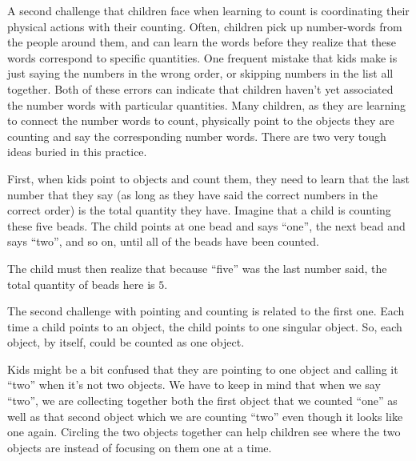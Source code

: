 \documentclass{ximera}
\begin{document}
A second challenge that children face when learning to count is coordinating their physical actions with their counting. Often, children pick up number-words from the people around them, and can learn the words before they realize that these words correspond to specific quantities.  One frequent mistake that kids make is just saying the numbers in the wrong order, or skipping numbers in the list all together. Both of these errors can indicate that children haven't yet associated the number words with particular quantities. Many children, as they are learning to connect the number words to  count, physically point to the objects they are counting and say the corresponding number words. There are two very tough ideas buried in this practice.

First, when kids point to objects and count them, they need to learn that the last number that they say (as long as they have said the correct numbers in the correct order) is the total quantity they have. Imagine that a child is counting these five beads. The child points at one bead and says ``one'', the next bead and says ``two'', and so on, until all of the beads have been counted. 

\begin{center}
\end{center}
The child must then realize that because ``five'' was the last number said, the total quantity of beads here is $5$.

The second challenge with pointing and counting is related to the first one. Each time a child points to an object, the child points to one singular object. So, each object, by itself, could be counted as one object.
\begin{center}
\end{center}
Kids might be a bit confused that they are pointing to one object and calling it ``two'' when it's not two objects. We have to keep in mind that when we say ``two'', we are collecting together both the first object that we counted ``one'' as well as that second object which we are counting ``two'' even though it looks like one again. Circling the two objects together can help children see where the two objects are instead of focusing on them one at a time.
\end{document}
